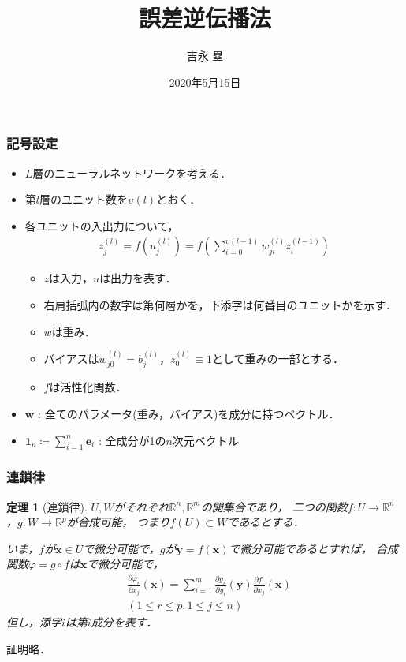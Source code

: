 \documentclass[dvipdfmx]{beamer}
\title{誤差逆伝播法}
\author{吉永 塁}
\date{2020年5月15日}
\newcommand{\fp}[2]{\frac{\partial #1}{\partial #2}}
\renewcommand{\b}[2]{b_{#1}^{(#2)}}
\renewcommand{\u}[2]{u_{#1}^{(#2)}}
\newcommand{\w}[2]{w_{#1}^{(#2)}}
\newcommand{\z}[2]{z_{#1}^{(#2)}}
\newtheorem{thm}{定理}
\begin{document}
\begin{frame}
    \titlepage
\end{frame}


\begin{frame}
    \frametitle{記号設定}
    \begin{itemize}
        \item $L$層のニューラルネットワークを考える．
        \item 第$l$層のユニット数を$\upsilon(l)$とおく．
        \item 各ユニットの入出力について，
            \begin{align*}
                \z{j}{l}
                = f(\u{j}{l})
                = f\left( \sum_{i=0}^{\upsilon(l-1)} \w{ji}{l} \z{i}{l-1} \right)
            \end{align*}
            \begin{itemize}
                \item $z$は入力，$u$は出力を表す．
                \item 右肩括弧内の数字は第何層かを，下添字は何番目のユニットかを示す．
                \item $w$は重み．
                \item バイアスは$\w{j0}{l} = \b{j}{l}$，$\z{0}{l} \equiv 1$として重みの一部とする．
                \item $f$は活性化関数．
            \end{itemize}
        \item $\bm{w}$ : 全てのパラメータ(重み，バイアス)を成分に持つベクトル．
        \item $\bm{1}_{n} \coloneqq \sum_{i=1}^{n} \bm{e}_i$ : 全成分が1の$n$次元ベクトル
    \end{itemize}
\end{frame}


\begin{frame}
    \frametitle{連鎖律}
    \begin{thm}[連鎖律]
        $U, W$がそれぞれ$\mathbb{R}^n, \mathbb{R}^m$の開集合であり，
        二つの関数$f: U \to \mathbb{R}^n$，$g: W \to \mathbb{R}^p$が合成可能，
        つまり$f(U) \subset W$であるとする．

        いま，$f$が$\bm{x} \in U$で微分可能で，$g$が$\bm{y} = f(\bm{x})$で微分可能であるとすれば，
        合成関数$\varphi = g \circ f$は$\bm{x}$で微分可能で，
        \begin{align*}
            &\fp{\varphi_r}{x_j}(\bm{x}) = \sum_{i=1}^{m} \fp{g_r}{y_i}(\bm{y}) \fp{f_i}{x_j}(\bm{x}) \\
            &(1 \leq r \leq p, 1 \leq j \leq n)
        \end{align*}
        但し，添字$i$は第$i$成分を表す．
    \end{thm}
    証明略．
\end{frame}
\end{document}
